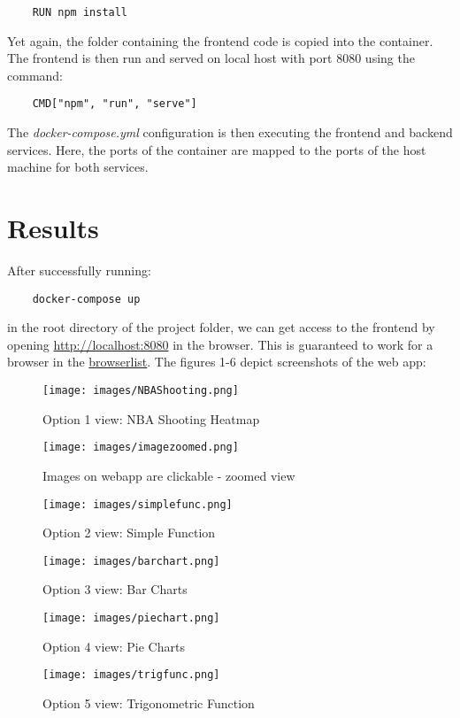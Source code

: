 \documentclass[sn-mathphys-num]{sn-jnl}%
\theoremstyle{thmstyleone}%
\theoremstyle{thmstyletwo}%
\theoremstyle{thmstylethree}%
\begin{document}
\bigskip
\begin{verbatim}
    RUN npm install
\end{verbatim}
\bigskip
Yet again, the folder containing the frontend code is copied into the container. The frontend is then run and served on local host with port 8080 using the command:

\bigskip
\begin{verbatim}
    CMD["npm", "run", "serve"]
\end{verbatim}
\bigskip

The \textit{docker-compose.yml} configuration is then executing the frontend and backend services. Here, the ports of the container are mapped to the ports of the host machine for both services.

\section{Results}\label{sec6}

After successfully running:

\bigskip
\begin{verbatim}
    docker-compose up
\end{verbatim}
\bigskip

in the root directory of the project folder, we can get access to the frontend by opening \url{http://localhost:8080} in the browser. This is guaranteed to work for a browser in the \href{https://caniuse.com/import-maps}{browserlist}. The figures 1-6 depict screenshots of the web app:

\begin{figure}[htbp]
    \centering
    \texttt{[image: images/NBAShooting.png]}
    \caption{Option 1 view: NBA Shooting Heatmap}
    \label{fig:img1}
\end{figure}
\begin{figure}[htbp]
    \centering
    \texttt{[image: images/imagezoomed.png]}
    \caption{Images on webapp are clickable - zoomed view}
    \label{fig:img2}
\end{figure}
\begin{figure}[htbp]
    \centering
    \texttt{[image: images/simplefunc.png]}
    \caption{Option 2 view: Simple Function}
    \label{fig:img3}
\end{figure}
\begin{figure}[htbp]
    \centering
    \texttt{[image: images/barchart.png]}
    \caption{Option 3 view: Bar Charts}
    \label{fig:img4}
\end{figure}
\begin{figure}[htbp]
    \centering
    \texttt{[image: images/piechart.png]}
    \caption{Option 4 view: Pie Charts}
    \label{fig:img5}
\end{figure}
\begin{figure}[htbp]
    \centering
    \texttt{[image: images/trigfunc.png]}
    \caption{Option 5 view: Trigonometric Function}
    \label{fig:img6}
\end{figure}
\end{document}
